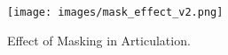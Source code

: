 \begin{figure}[t]
\centering
   \texttt{[image: images/mask\_effect\_v2.png]}
    \caption{Effect of Masking in Articulation. }
    \vspace{-5mm}
\label{fig:mask_effect}
\end{figure}